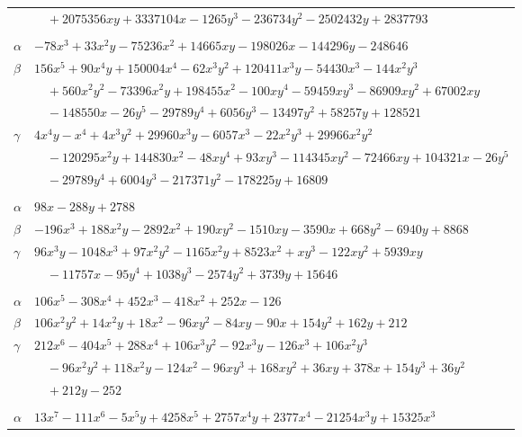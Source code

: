 \documentclass[11pt]{article}
\begin{document}
\begin{longtable}{@{}ll@{}}
 & $\quad +2075356xy+3337104x-1265y^{3}-236734y^{2}-2502432y+2837793$\\
\addlinespace[3pt]
\multicolumn{2}{@{}l}{$\{i,j\}=\{40,83\}$, $k_{ij}=2^{3}\cdot 3^{2}\cdot 5^{2}\cdot 7^{3}$}\\
$\alpha$ & $-78x^{3}+33x^{2}y-75236x^{2}+14665xy-198026x-144296y-248646$\\
$\beta$ & $156x^{5}+90x^{4}y+150004x^{4}-62x^{3}y^{2}+120411x^{3}y-54430x^{3}-144x^{2}y^{3}$\\
 & $\quad +560x^{2}y^{2}-73396x^{2}y+198455x^{2}-100xy^{4}-59459xy^{3}-86909xy^{2}+67002xy$\\
 & $\quad -148550x-26y^{5}-29789y^{4}+6056y^{3}-13497y^{2}+58257y+128521$\\
$\gamma$ & $4x^{4}y-x^{4}+4x^{3}y^{2}+29960x^{3}y-6057x^{3}-22x^{2}y^{3}+29966x^{2}y^{2}$\\
 & $\quad -120295x^{2}y+144830x^{2}-48xy^{4}+93xy^{3}-114345xy^{2}-72466xy+104321x-26y^{5}$\\
 & $\quad -29789y^{4}+6004y^{3}-217371y^{2}-178225y+16809$\\
\addlinespace[3pt]
\multicolumn{2}{@{}l}{$\{i,j\}=\{40,103\}$, $k_{ij}=2^{7}\cdot 3^{3}\cdot 5^{2}$}\\
$\alpha$ & $98x-288y+2788$\\
$\beta$ & $-196x^{3}+188x^{2}y-2892x^{2}+190xy^{2}-1510xy-3590x+668y^{2}-6940y+8868$\\
$\gamma$ & $96x^{3}y-1048x^{3}+97x^{2}y^{2}-1165x^{2}y+8523x^{2}+xy^{3}-122xy^{2}+5939xy$\\
 & $\quad -11757x-95y^{4}+1038y^{3}-2574y^{2}+3739y+15646$\\
\addlinespace[3pt]
\multicolumn{2}{@{}l}{$\{i,j\}=\{43,44\}$, $k_{ij}=2\cdot 3^{2}\cdot 7$}\\
$\alpha$ & $106x^{5}-308x^{4}+452x^{3}-418x^{2}+252x-126$\\
$\beta$ & $106x^{2}y^{2}+14x^{2}y+18x^{2}-96xy^{2}-84xy-90x+154y^{2}+162y+212$\\
$\gamma$ & $212x^{6}-404x^{5}+288x^{4}+106x^{3}y^{2}-92x^{3}y-126x^{3}+106x^{2}y^{3}$\\
 & $\quad -96x^{2}y^{2}+118x^{2}y-124x^{2}-96xy^{3}+168xy^{2}+36xy+378x+154y^{3}+36y^{2}$\\
 & $\quad +212y-252$\\
\addlinespace[3pt]
\multicolumn{2}{@{}l}{$\{i,j\}=\{43,45\}$, $k_{ij}=3^{2}\cdot 7^{3}$}\\
$\alpha$ & $13x^{7}-111x^{6}-5x^{5}y+4258x^{5}+2757x^{4}y+2377x^{4}-21254x^{3}y+15325x^{3}$\\

\end{longtable}
\end{document}
